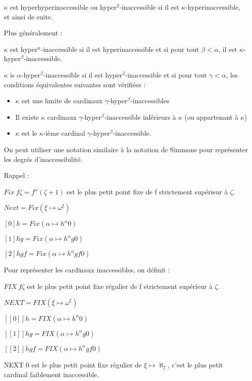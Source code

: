 \documentclass[12pt]{beamer}
\begin{document}
\begin{frame}

$\kappa$ est hyperhyperinaccessible ou hyper$^2$-inaccessible si il est $\kappa$-hyperinaccessible, et ainsi de suite.

Plus généralement :

\(\kappa\) est hyper\(^\alpha\)-inaccessible si il est hyperinaccessible et si pour tout \( \beta < \alpha \), il est \(\kappa\)-hyper\(^\beta\)-inaccessible.

\(\kappa\) is \(\alpha\)-hyper\(^\beta\)-inaccessible si il est hyper\(^\beta\)-inaccessible et si pour tout \( \gamma < \alpha \), les conditions équivalentes suivantes sont vérifiées :

\begin{itemize}
     \setlength{\itemsep}{1pt}
     \setlength{\parskip}{0pt}
     \setlength{\parsep}{0pt}
\item \(\kappa\)  est une limite de cardinaux \(\gamma\)-hyper\(^\beta\)-inaccessibles
\item Il existe \(\kappa\) cardinaux \(\gamma\)-hyper\(^\beta\)-inaccessible inférieurs à \(\kappa\) (ou appartenant à \(\kappa\))
\item \(\kappa\) est le \(\kappa\)-ième cardinal \(\gamma\)-hyper\(^\beta\)-inaccessible.
\end{itemize}

\end{frame}
\begin{frame}

\small

On peut utiliser une notation similaire à la notation de Simmons pour représenter les degrés d'inaccessibilité.

Rappel :

\( Fix\ f \zeta = f^\omega (\zeta+1) \) est le plus petit point fixe de f strictement supérieur à \( \zeta \).

\( Next = Fix (\xi \mapsto \omega^\xi) \)

\( [0] h = Fix (\alpha \mapsto h^\alpha 0) \)

\( [1] h g = Fix (\alpha \mapsto h^\alpha g 0)  \)

\( [2] h g f = Fix (\alpha \mapsto h^\alpha g f 0) \)

Pour représenter les cardinaux inaccessibles, on définit :

\( FIX\ f \zeta \) est le plus petit point fixe régulier de f strictement supérieur à \( \zeta \).

\( NEXT = FIX (\xi \mapsto \omega^\xi) \)

\( [[0]] h = FIX (\alpha \mapsto h^\alpha 0) \)

\( [[1]] h g = FIX (\alpha \mapsto h^\alpha g 0)  \)

\( [[2]] h g f = FIX (\alpha \mapsto h^\alpha g f 0) \)

NEXT 0 est le plus petit point fixe régulier de \( \xi \mapsto \aleph_\xi \), c'est le plus petit cardinal faiblement inaccessible.

\end{frame}
\end{document}
